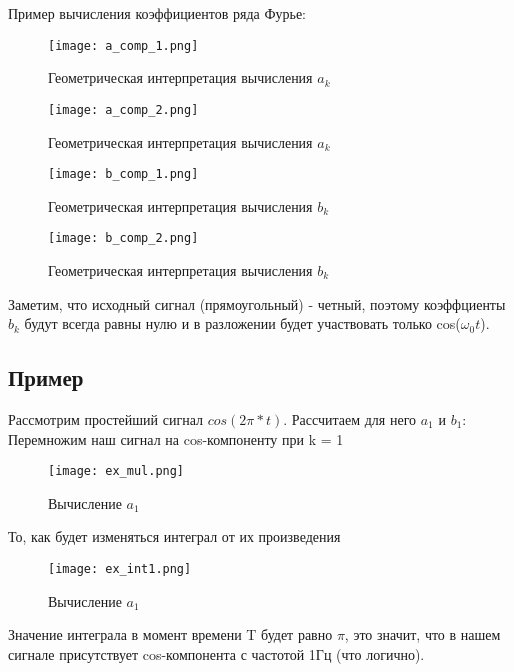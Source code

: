 Пример вычисления коэффициентов ряда Фурье:

\begin{figure}[H]
    \centering
    \texttt{[image: a\_comp\_1.png]}
    \caption{Геометрическая интерпретация вычисления $a_k$}
\end{figure}


\begin{figure}[H]
    \centering
    \texttt{[image: a\_comp\_2.png]}
    \caption{Геометрическая интерпретация вычисления $a_k$}
\end{figure}

\begin{figure}[H]
    \centering
    \texttt{[image: b\_comp\_1.png]}
    \caption{Геометрическая интерпретация вычисления $b_k$}
\end{figure}


\begin{figure}[H]
    \centering
    \texttt{[image: b\_comp\_2.png]}
    \caption{Геометрическая интерпретация вычисления $b_k$}
\end{figure}

Заметим, что исходный сигнал (прямоугольный) - четный, поэтому коэффциенты $b_k$ будут всегда равны нулю и в разложении
будет участвовать только cos($\omega_0t$).

\subsection*{\textbf{Пример}}

Рассмотрим простейший сигнал $cos(2\pi*t)$. Рассчитаем для него $a_1$ и $b_1$: \\

Перемножим наш сигнал на cos-компоненту при k = 1

\begin{figure}[H]
    \centering
    \texttt{[image: ex\_mul.png]}
    \caption{Вычисление $a_1$}
\end{figure}

То, как будет изменяться интеграл от их произведения
\begin{figure}[H]
    \centering
    \texttt{[image: ex\_int1.png]}
    \caption{Вычисление $a_1$}
\end{figure}

Значение интеграла в момент времени T будет равно $\pi$, это значит, что в нашем
сигнале присутствует cos-компонента с частотой 1Гц (что логично). \\

